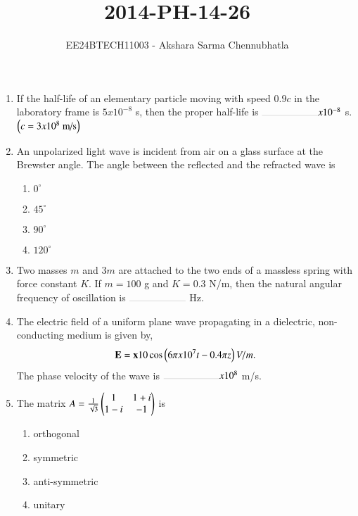 \documentclass[journal,12pt,onecolumn]{IEEEtran}
\theoremstyle{remark}
\begin{document}

\title{2014-PH-14-26}
\author{EE24BTECH11003 - Akshara Sarma Chennubhatla}
\maketitle
\begin{enumerate}[start=14]

\item If the half-life of an elementary particle moving with speed $0.9c$ in the laboratory frame is $5 x 10^{-8}$ s, then the proper half-life is $\rule{2cm}{0.1pt} x 10^{-8}$ s. $\left(c=3 x 10^8 \text{ m/s}\right)$
\hfill{}

\item An unpolarized light wave is incident from air on a glass surface at the Brewster angle. The angle between the reflected and the refracted wave is
\hfill{}
\begin{enumerate}
\item $0^{\circ}$
\item $45^{\circ}$
\item $90^{\circ}$
\item $120^{\circ}$
\end{enumerate}

\item Two masses $m$ and $3m$ are attached to the two ends of a massless spring with force constant $K$. If $m=100$ g and $K=0.3$ N/m, then the natural angular frequency of oscillation is $\rule{2cm}{0.1pt}$ Hz.
\hfill{}

\item The electric field of a uniform plane wave propagating in a dielectric, non-conducting medium is given by,
\begin{align*}
\mathbf{E} = \mathbf{x}10\cos\left(6\pi x 10^7t - 0.4\pi z\right)V/m. 
\end{align*}
The phase velocity of the wave is $\rule{2cm}{0.1pt} x 10^8$ m/s.
\hfill{}

\item The matrix $A = \frac{1}{\sqrt{3}}\begin{pmatrix}1 & 1+i\\1-i & -1\end{pmatrix}$ is
\hfill{}
\begin{enumerate}
\item orthogonal
\item symmetric
\item anti-symmetric
\item unitary
\end{enumerate}


\end{enumerate}
\end{document}
